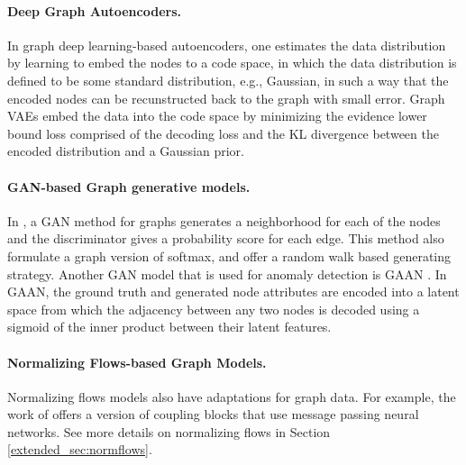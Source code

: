 \documentclass[letterpaper]{article} %
\newcommand{\ron}[1]{{{\textcolor{red}{\textbf{[Ron:} {#1}\textbf{]}}}}}
\begin{document}

\paragraph{Deep Graph Autoencoders.}
\label{sec:deep graph autoencoders}
In graph deep learning-based autoencoders,  one estimates the data distribution by learning to embed the nodes to a code space, in which the data distribution is defined to be some standard distribution,  e.g., Gaussian, in such a way that the encoded nodes can be recunstructed back to the graph with small error. Graph VAEs \cite{kipf2016variational,grover2019graphite,JMLR:v21:19-671,mehta2019stochastic} embed the data into the code space by minimizing the evidence lower bound loss comprised of the decoding loss and the KL divergence between the encoded distribution and a Gaussian prior. %

\paragraph{GAN-based Graph generative models.}

In  \cite{wang2018graphgan}, a GAN method for graphs generates a neighborhood for each of the nodes and the discriminator gives a probability score for each edge. This method also formulate a graph version of softmax, and offer a random walk based generating strategy. Another GAN model that is used for anomaly detection is GAAN \cite{chen2020gaan}. In GAAN, the ground truth and generated node attributes are encoded into a latent space from which the adjacency between any two nodes is decoded using a sigmoid of the inner product between their latent features. 

\paragraph{Normalizing Flows-based Graph Models.}
Normalizing flows models \cite{dinh2016density}  also have adaptations for graph data. For example, the work of \cite{liu2019graph,madhawa2019graphnvp} offers a version of coupling blocks that use message passing neural networks.  See more details on normalizing flows in Section \ref{extended_sec:normflows}.
\end{document}
